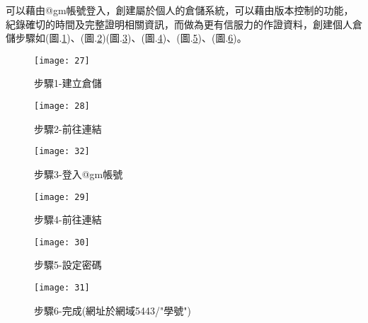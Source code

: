 \par
\twelve 可以藉由@gm帳號登入，創建屬於個人的倉儲系統，可以藉由版本控制的功能，紀錄確切的時間及完整證明相關資訊，而做為更有信服力的作證資料，創建個人倉儲步驟如(圖.\ref{fig.步驟1-建立倉儲})、(圖.\ref{fig.步驟2-點擊連結})(圖.\ref{fig.步驟3-登入@gm帳號})、(圖.\ref{fig.步驟4-前往連結})、(圖.\ref{fig.步驟5-設定密碼})、(圖.\ref{fig.步驟6-完成})。
\\
\par
\begin{figure}[hbt!]
\begin{center}
\texttt{[image: 27]}
\caption{\large 步驟1-建立倉儲}\label{fig.步驟1-建立倉儲}
\end{center}
\end{figure}
\par
\begin{figure}[hbt!]
\begin{center}
\texttt{[image: 28]}
\caption{\large 步驟2-前往連結}\label{fig.步驟2-點擊連結}
\end{center}
\end{figure}
\par
\begin{figure}[hbt!]
\begin{center}
\texttt{[image: 32]}
\caption{\large 步驟3-登入@gm帳號}\label{fig.步驟3-登入@gm帳號}
\end{center}
\end{figure}
\par
\begin{figure}[hbt!]
\begin{center}
\texttt{[image: 29]}
\caption{\large 步驟4-前往連結}\label{fig.步驟4-前往連結}
\end{center}
\end{figure}
\par
\begin{figure}[hbt!]
\begin{center}
\texttt{[image: 30]}
\caption{\large 步驟5-設定密碼}\label{fig.步驟5-設定密碼}
\end{center}
\end{figure}
\par
\begin{figure}[hbt!]
\begin{center}
\texttt{[image: 31]}
\caption{\large 步驟6-完成(網址於網域5443/"學號")}\label{fig.步驟6-完成}
\end{center}
\end{figure}
\par



